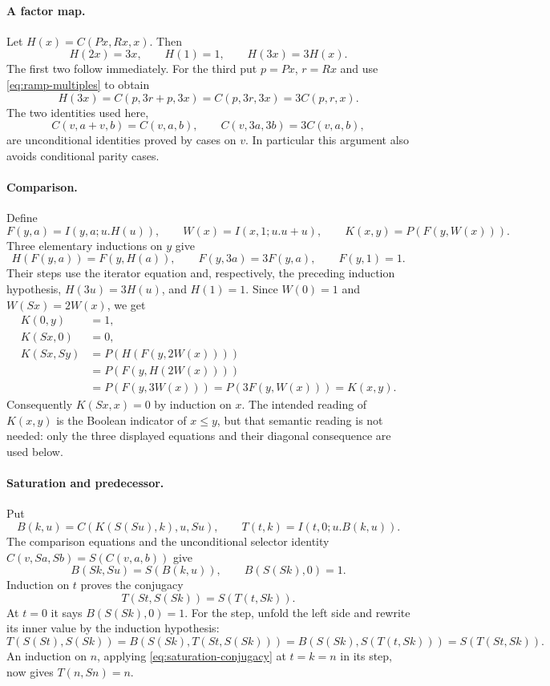 \paragraph{A factor map.}
Let $H(x)=C(Px,Rx,x)$. Then
\[
 H(2x)=3x,\qquad H(1)=1,\qquad H(3x)=3H(x).
\]
The first two follow immediately. For the third put $p=Px$, $r=Rx$ and
use \eqref{eq:ramp-multiples} to obtain
\[
 H(3x)=C(p,3r+p,3x)=C(p,3r,3x)=3C(p,r,x).
\]
The two identities used here,
\[
 C(v,a+v,b)=C(v,a,b),\qquad
 C(v,3a,3b)=3C(v,a,b),
\]
are unconditional identities proved by cases on $v$. In particular this
argument also avoids conditional parity cases.

\paragraph{Comparison.}
Define
\[
 F(y,a)=I(y,a;u.H(u)),\qquad W(x)=I(x,1;u.u+u),\qquad
 K(x,y)=P(F(y,W(x))).
\]
Three elementary inductions on $y$ give
\[
 H(F(y,a))=F(y,H(a)),\qquad
 F(y,3a)=3F(y,a),\qquad F(y,1)=1.
\]
Their steps use the iterator equation and, respectively, the preceding
induction hypothesis, $H(3u)=3H(u)$, and $H(1)=1$.
Since $W(0)=1$ and $W(Sx)=2W(x)$, we get
\begin{align*}
 K(0,y)&=1,\\
 K(Sx,0)&=0,\\
 K(Sx,Sy)
 &=P(H(F(y,2W(x))))\\
 &=P(F(y,H(2W(x))))\\
 &=P(F(y,3W(x)))
  =P(3F(y,W(x)))=K(x,y).
\end{align*}
Consequently $K(Sx,x)=0$ by induction on $x$.
The intended reading of $K(x,y)$ is the Boolean indicator of $x\leq y$,
but that semantic reading is not needed: only the three displayed equations
and their diagonal consequence are used below.

\paragraph{Saturation and predecessor.}
Put
\[
 B(k,u)=C(K(S(Su),k),u,Su),\qquad
 T(t,k)=I(t,0;u.B(k,u)).
\]
The comparison equations and the unconditional selector identity
$C(v,Sa,Sb)=S(C(v,a,b))$ give
\[
 B(Sk,Su)=S(B(k,u)),\qquad B(S(Sk),0)=1.
\]
Induction on $t$ proves the conjugacy
\begin{equation}
 T(St,S(Sk))=S(T(t,Sk)).\tag{T}\label{eq:saturation-conjugacy}
\end{equation}
At $t=0$ it says $B(S(Sk),0)=1$. For the step, unfold the left side and
rewrite its inner value by the induction hypothesis:
\[
 T(S(St),S(Sk))
 =B(S(Sk),T(St,S(Sk)))
 =B(S(Sk),S(T(t,Sk)))
 =S(T(St,Sk)).
\]
An induction on $n$, applying \eqref{eq:saturation-conjugacy} at $t=k=n$
in its step, now gives $T(n,Sn)=n$.

